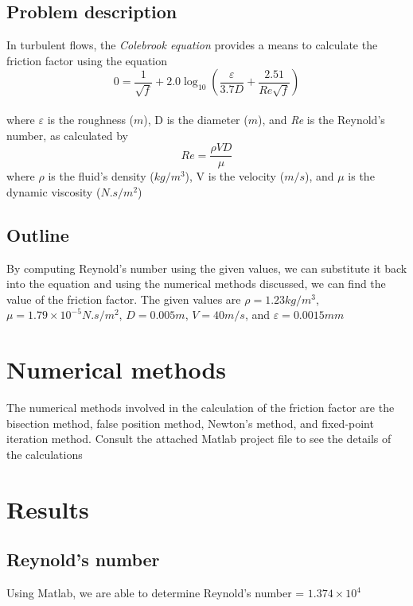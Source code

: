 \documentclass{book}
\begin{document}
	\subsection{Problem description}
	In turbulent flows, the \textit{Colebrook equation} provides a means to calculate the friction factor using the equation\\
    \[ 0 =  \frac{1}{\sqrt{f}} + 2.0 \log_{10} \left(\frac{\varepsilon}{3.7D} + \frac{2.51}{\textit{Re}\sqrt{f}}\right) \] \\
    where $\varepsilon$ is the roughness (${m}$), D is the diameter (${m}$), and \textit{Re} is the Reynold's number, as calculated by
    \[\textit{Re} = \frac{\rho V D}{\mu}\]
    where $\rho$ is the fluid's density (${kg/m^{3}}$), V is the velocity (${m/s}$), and ${\mu}$ is the dynamic viscosity (${N.s/m^2}$)
    
	\subsection{Outline}
	By computing Reynold's number using the given values, we can substitute it back into the equation and using the numerical methods discussed, we can find the value of the friction factor. The given values are ${\rho = 1.23 kg/m^3}$, ${\mu = 1.79 \times 10^{-5} N.s/m^2}$, ${D = 0.005 m}$, ${V = 40 m/s}$, and ${\varepsilon = 0.0015 mm}$
	
	\section{Numerical methods}
	The numerical methods involved in the calculation of the friction factor are the bisection method, false position method, Newton's method, and fixed-point iteration method. Consult the attached Matlab project file to see the details of the calculations
	
	\section{Results}
	\subsection{Reynold's number}
    Using Matlab, we are able to determine Reynold's number = ${1.374 \times 10^4}$
    
\end{document}
